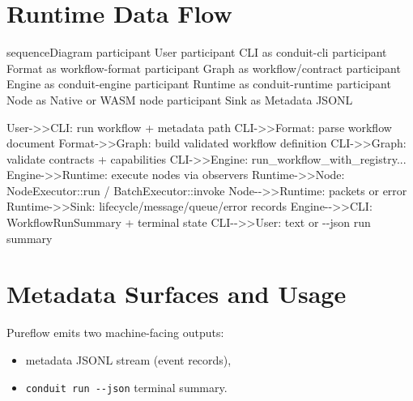 \documentclass[
  letterpaper,
]{report}
\newenvironment{Shaded}{\begin{snugshade}}{\end{snugshade}}
\newcommand{\NormalTok}[1]{\textcolor[rgb]{0.00,0.23,0.31}{#1}}
\providecommand{\tightlist}{%
  \setlength{\itemsep}{0pt}\setlength{\parskip}{0pt}}
\begin{document}
\section{Runtime Data Flow}\label{runtime-data-flow}

\begin{Shaded}
\begin{Highlighting}[]
\NormalTok{sequenceDiagram}
\NormalTok{    participant User}
\NormalTok{    participant CLI as conduit{-}cli}
\NormalTok{    participant Format as workflow{-}format}
\NormalTok{    participant Graph as workflow/contract}
\NormalTok{    participant Engine as conduit{-}engine}
\NormalTok{    participant Runtime as conduit{-}runtime}
\NormalTok{    participant Node as Native or WASM node}
\NormalTok{    participant Sink as Metadata JSONL}

\NormalTok{    User{-}\textgreater{}\textgreater{}CLI: run workflow + metadata path}
\NormalTok{    CLI{-}\textgreater{}\textgreater{}Format: parse workflow document}
\NormalTok{    Format{-}\textgreater{}\textgreater{}Graph: build validated workflow definition}
\NormalTok{    CLI{-}\textgreater{}\textgreater{}Graph: validate contracts + capabilities}
\NormalTok{    CLI{-}\textgreater{}\textgreater{}Engine: run\_workflow\_with\_registry...}
\NormalTok{    Engine{-}\textgreater{}\textgreater{}Runtime: execute nodes via observers}
\NormalTok{    Runtime{-}\textgreater{}\textgreater{}Node: NodeExecutor::run / BatchExecutor::invoke}
\NormalTok{    Node{-}{-}\textgreater{}\textgreater{}Runtime: packets or error}
\NormalTok{    Runtime{-}\textgreater{}\textgreater{}Sink: lifecycle/message/queue/error records}
\NormalTok{    Engine{-}{-}\textgreater{}\textgreater{}CLI: WorkflowRunSummary + terminal state}
\NormalTok{    CLI{-}{-}\textgreater{}\textgreater{}User: text or {-}{-}json run summary}
\end{Highlighting}
\end{Shaded}

\section{Metadata Surfaces and Usage}\label{metadata-surfaces-and-usage}

Pureflow emits two machine-facing outputs:

\begin{itemize}
\tightlist
\item
  metadata JSONL stream (event records),
\item
  \texttt{conduit\ run\ -\/-json} terminal summary.
\end{itemize}
\end{document}
